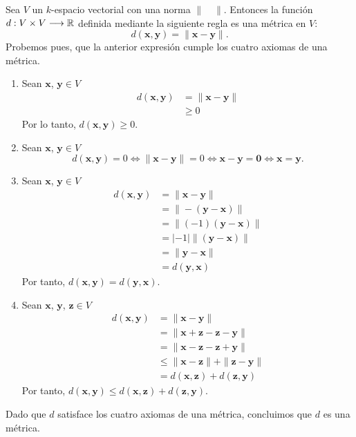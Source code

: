 \begin{example}
    Sea $V$ un $k$-espacio vectorial con una norma $\| \quad \|$. Entonces la función $d:V \times V \longrightarrow \RR$ definida mediante la siguiente regla es una métrica en $V$:
    $$d(\mathbf{x}, \mathbf{y}) = \| \mathbf{x} - \mathbf{y} \|.$$
    \demostracion Probemos pues, que la anterior expresión cumple los cuatro axiomas de una métrica.
    \begin{enumerate}[label=\roman*.]
        \item Sean $\mathbf{x}$, $\mathbf{y} \in V$
        \begin{align*}
            d(\mathbf{x}, \mathbf{y}) & = \| \mathbf{x} - \mathbf{y} \| \\
            & \geq 0
        \end{align*}
         Por lo tanto, $d(\mathbf{x}, \mathbf{y}) \geq 0$.
         \item Sean $\mathbf{x}$, $\mathbf{y} \in V$
         $$d(\mathbf{x}, \mathbf{y}) = 0 \Longleftrightarrow \| \mathbf{x} - \mathbf{y} \| = 0 \Longleftrightarrow \mathbf{x} - \mathbf{y} = \mathbf{0} \Longleftrightarrow \mathbf{x} = \mathbf{y}.$$
         \item Sean $\mathbf{x}$, $\mathbf{y} \in V$
         \begin{align*}
             d(\mathbf{x}, \mathbf{y}) & = \| \mathbf{x} - \mathbf{y} \| \\
             & = \| - (\mathbf{y} - \mathbf{x}) \| \\
             & = \| (-1) (\mathbf{y} - \mathbf{x}) \| \\
             & = |-1| \| (\mathbf{y} - \mathbf{x}) \| \\
             & = \| \mathbf{y} - \mathbf{x} \| \\
             & = d(\mathbf{y}, \mathbf{x})
         \end{align*}
         Por tanto, $d(\mathbf{x}, \mathbf{y}) = d(\mathbf{y}, \mathbf{x})$.\newpage
         \item Sean $\mathbf{x}$, $\mathbf{y}$, $\mathbf{z} \in V$
         \begin{align*}
             d(\mathbf{x}, \mathbf{y}) & = \| \mathbf{x} - \mathbf{y} \| \\
             & = \| \mathbf{x} + \mathbf{z} - \mathbf{z} - \mathbf{y} \| \\
             & = \| \mathbf{x} - \mathbf{z} - \mathbf{z} + \mathbf{y} \| \\
             & \leq \| \mathbf{x} - \mathbf{z} \| + \| \mathbf{z} - \mathbf{y} \| \\
             & = d(\mathbf{x}, \mathbf{z}) + d(\mathbf{z}, \mathbf{y})
         \end{align*}
         Por tanto, $d(\mathbf{x}, \mathbf{y}) \leq d(\mathbf{x}, \mathbf{z}) + d(\mathbf{z}, \mathbf{y})$.
    \end{enumerate}
    Dado que $d$ satisface los cuatro axiomas de una métrica, concluimos que  $d$ es una métrica.
\end{example}

